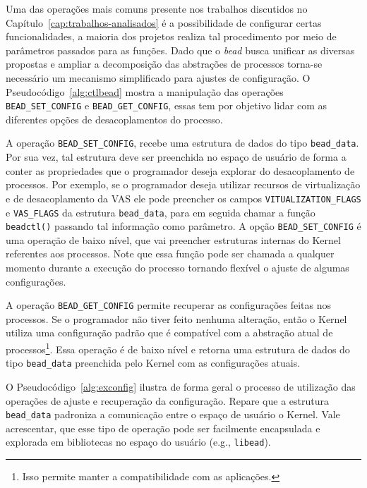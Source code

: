 Uma das operações mais comuns presente nos trabalhos discutidos no
Capítulo~\ref{cap:trabalhos-analisados} é a possibilidade de configurar certas
funcionalidades, a maioria dos projetos realiza tal procedimento por meio de
parâmetros passados para as funções. Dado que o \emph{bead} busca unificar as
diversas propostas e ampliar a decomposição das abstrações de processos
torna-se necessário um mecanismo simplificado para ajustes de configuração. O
Pseudocódigo~\ref{alg:ctlbead} mostra a manipulação das operações
\texttt{BEAD\_SET\_CONFIG} e \texttt{BEAD\_GET\_CONFIG}, essas tem por objetivo
lidar com as diferentes opções de desacoplamentos do processo.

A operação \texttt{BEAD\_SET\_CONFIG}, recebe uma estrutura de dados do tipo
\texttt{bead\_data}. Por sua vez, tal estrutura deve ser preenchida no espaço
de usuário de forma a conter as propriedades que o programador deseja explorar
do desacoplamento de processos. Por exemplo, se o programador deseja utilizar
recursos de virtualização e de desacoplamento da VAS ele pode preencher os
campos \texttt{VITUALIZATION\_FLAGS} e \texttt{VAS\_FLAGS} da estrutura
\texttt{bead\_data}, para em seguida chamar a função \texttt{beadctl()}
passando tal informação como parâmetro. A opção \texttt{BEAD\_SET\_CONFIG} é
uma operação de baixo nível, que vai preencher estruturas internas do Kernel
referentes aos processos. Note que essa função pode ser chamada a qualquer
momento durante a execução do processo tornando flexível o ajuste de algumas
configurações.

A operação \texttt{BEAD\_GET\_CONFIG} permite recuperar as configurações feitas
nos processos. Se o programador não tiver feito nenhuma alteração, então o
Kernel utiliza uma configuração padrão que é compatível com a abstração atual
de processos\footnote{Isso permite manter a compatibilidade com as
aplicações.}. Essa operação é de baixo nível e retorna uma estrutura de dados
do tipo \texttt{bead\_data} preenchida pelo Kernel com as configurações atuais.



O Pseudocódigo~\ref{alg:exconfig} ilustra de forma geral o processo de
utilização das operações de ajuste e recuperação da configuração. Repare que a
estrutura \texttt{bead\_data} padroniza a comunicação entre o espaço de usuário
o Kernel. Vale acrescentar, que esse tipo de operação pode ser facilmente
encapsulada e explorada em bibliotecas no espaço do usuário (e.g.,
\texttt{libead}).

